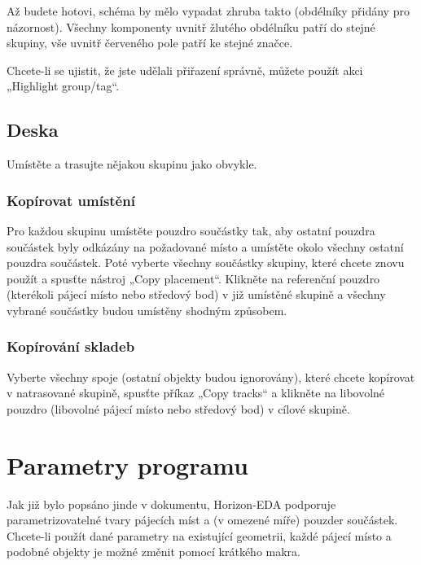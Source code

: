 \documentclass[letterpaper,10pt,czech]{sphinxmanual}
\begin{document}
Až budete hotovi, schéma by mělo vypadat zhruba takto (obdélníky přidány pro názornost). Všechny komponenty uvnitř žlutého obdélníku patří do stejné skupiny, vše uvnitř červeného pole patří ke stejné značce.

\noindent{}

Chcete-li se ujistit, že jste udělali přiřazení správně, můžete použít akci „Highlight group/tag“.


\section{Deska}
\label{\detokenize{copy-layout-placement:deska}}
Umístěte a trasujte nějakou skupinu jako obvykle.


\subsection{Kopírovat umístění}
\label{\detokenize{copy-layout-placement:kopirovat-umisteni}}
Pro každou skupinu umístěte pouzdro součástky tak, aby ostatní pouzdra součástek byly odkázány na požadované místo a umístěte okolo všechny ostatní pouzdra součástek. Poté vyberte všechny součástky skupiny, které chcete znovu použít a spusťte nástroj „Copy placement“. Klikněte na referenční pouzdro (kterékoli pájecí místo nebo středový bod) v již umístěné skupině a všechny vybrané součástky budou umístěny shodným způsobem.


\subsection{Kopírování skladeb}
\label{\detokenize{copy-layout-placement:kopirovani-skladeb}}
Vyberte všechny spoje (ostatní objekty budou ignorovány), které chcete kopírovat
v natrasované skupině, spusťte příkaz „Copy tracks“ a klikněte na libovolné pouzdro
(libovolné pájecí místo nebo středový bod) v cílové skupině.


\chapter{Parametry programu}
\label{\detokenize{parameter-programs:parametry-programu}}\label{\detokenize{parameter-programs::doc}}
Jak již bylo popsáno jinde v dokumentu, Horizon-EDA podporuje parametrizovatelné tvary pájecích míst
a (v omezené míře) pouzder součástek. Chcete-li použít dané parametry na existující geometrii, každé pájecí místo a podobné objekty je možné změnit pomocí krátkého makra.
\end{document}
